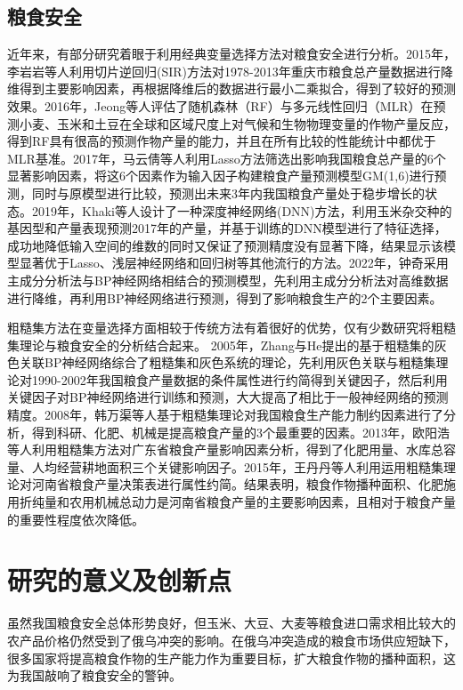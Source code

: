 \subsection{粮食安全}

近年来，有部分研究着眼于利用经典变量选择方法对粮食安全进行分析。2015年，李岩岩等人\cite{基于SIR方法分析重庆市粮食产量}利用切片逆回归(SIR)方法对1978-2013年重庆市粮食总产量数据进行降维得到主要影响因素，再根据降维后的数据进行最小二乘拟合，得到了较好的预测效果。2016年，Jeong等人\cite{jeong2016random}评估了随机森林（RF）与多元线性回归（MLR）在预测小麦、玉米和土豆在全球和区域尺度上对气候和生物物理变量的作物产量反应，得到RF具有很高的预测作物产量的能力，并且在所有比较的性能统计中都优于MLR基准。2017年，马云倩等人\cite{孙君茂2018}利用Lasso方法筛选出影响我国粮食总产量的6个显著影响因素，将这6个因素作为输入因子构建粮食产量预测模型GM(1,6)进行预测，同时与原模型进行比较，预测出未来3年内我国粮食产量处于稳步增长的状态。2019年，Khaki等人\cite{khaki2019crop}设计了一种深度神经网络(DNN)方法，利用玉米杂交种的基因型和产量表现预测2017年的产量，并基于训练的DNN模型进行了特征选择，成功地降低输入空间的维数的同时又保证了预测精度没有显著下降，结果显示该模型显著优于Lasso、浅层神经网络和回归树等其他流行的方法。2022年，钟奇\cite{基于主成分分析的BP神经网络粮食产量预测模型}采用主成分分析法与BP神经网络相结合的预测模型，先利用主成分分析法对高维数据进行降维，再利用BP神经网络进行预测，得到了影响粮食生产的2个主要因素。

粗糙集方法在变量选择方面相较于传统方法有着很好的优势，仅有少数研究将粗糙集理论与粮食安全的分析结合起来。 2005年，Zhang与He\cite{2005Study}提出的基于粗糙集的灰色关联BP神经网络综合了粗糙集和灰色系统的理论，先利用灰色关联与粗糙集理论对1990-2002年我国粮食产量数据的条件属性进行约简得到关键因子，然后利用关键因子对BP神经网络进行训练和预测，大大提高了相比于一般神经网络的预测精度。2008年，韩万渠等人\cite{韩万渠2008基于粗糙集理论的我国粮食生产能力制约因素分析}基于粗糙集理论对我国粮食生产能力制约因素进行了分析，得到科研、化肥、机械是提高粮食产量的3个最重要的因素。2013年，欧阳浩等人\cite{基于粗糙集方法的广东省粮食产量影响因素分析}利用粗糙集方法对广东省粮食产量影响因素分析，得到了化肥用量、水库总容量、人均经营耕地面积三个关键影响因子。2015年，王丹丹等人\cite{基于粗糙集理论的河南省粮食产量预测研究}利用运用粗糙集理论对河南省粮食产量决策表进行属性约简。结果表明，粮食作物播种面积、化肥施用折纯量和农用机械总动力是河南省粮食产量的主要影响因素，且相对于粮食产量的重要性程度依次降低。

\section{研究的意义及创新点}
虽然我国粮食安全总体形势良好，但玉米、大豆、大麦等粮食进口需求相比较大的农产品价格仍然受到了俄乌冲突的影响。在俄乌冲突造成的粮食市场供应短缺下，很多国家将提高粮食作物的生产能力作为重要目标，扩大粮食作物的播种面积，这为我国敲响了粮食安全的警钟。

